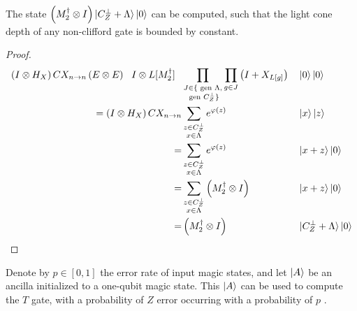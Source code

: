 \documentclass[manuscript,screen,review]{acmart}
\begin{document}
\begin{claim}
  \label{claim:lowlightcone}
  The state $\left(M_{2}^{\dagger}\otimes I\right)\ket{ C_{Z}^{\perp} +   \Lambda   }\ket{0}$ can be computed, such that the light cone depth of any non-clifford gate is bounded by constant.    
\end{claim}
\begin{proof}
\begin{align*}
  \left( I \otimes H_{X} \right) CX_{n\rightarrow n} \left(E \otimes E \right) \ \ I \otimes L[M_{2}^{\dagger}] \ \ & \prod_{\substack{ J\in \{ \text{ gen }\Lambda,\\ \text{ gen } C_{Z}^{\perp} \}}} \prod_{g \in J} \left( I +  X_{L[g]} \right) && \ket{0} \ket{0} \\  
   = \left( I \otimes H_{X}   \right) CX_{n\rightarrow n} & \sum_{\substack{ z \in C_{Z}^\perp \\  x\in \Lambda}}  e^{\varphi(z)} && \ket{x}\ket{z} \\ 
    = & \sum_{\substack{ z \in C_{Z}^\perp \\  x\in \Lambda}}   e^{\varphi(z)} && \ket{x+z}\ket{0} \\ 
    = & \sum_{\substack{ z \in C_{Z}^\perp \\  x\in \Lambda}} \left(M_{2}^{\dagger}\otimes I\right) && \ket{x+z}\ket{0} \\ 
    = & \left(M_{2}^{\dagger}\otimes I\right) && \ket{ C_{Z}^{\perp} +   \Lambda   }\ket{0}
\end{align*}
\end{proof}
Denote by $p \in [0,1]$ the error rate of input magic states, and let $\ket{A}$ be an ancilla initialized to a one-qubit magic state. This $\ket{A}$ can be used to compute the $T$ gate, with a probability of $Z$ error occurring with a probability of $p$ \cite{bravyi2012magic}.
\end{document}
